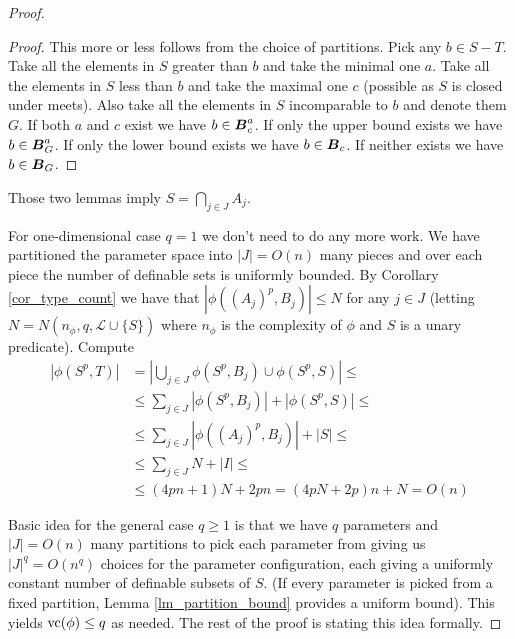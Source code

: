 \documentclass{amsart}
\DeclareMathOperator{\BT}{\boldface B}
\renewcommand{\LL}{\mathcal L}
\begin{document}
\begin{proof}
  \begin{proof}
    This more or less follows from the choice of partitions. Pick any $b \in S - T$. Take all the elements in $S$ greater than $b$ and take the minimal one $a$. Take all the elements in $S$ less than $b$ and take the maximal one $c$ (possible as $S$ is closed under meets). Also take all the elements in $S$ incomparable to $b$ and denote them $G$. If both $a$ and $c$ exist we have $b \in \BT^a_c$. If only the upper bound exists we have $b \in \BT^a_G$. If only the lower bound exists we have $b \in \BT_c$. If neither exists we have $b \in \BT_G$.
  \end{proof}
  
  \begin{Note}
    Those two lemmas imply $S = \bigcap_{j \in J} A_j$.
  \end{Note}
  
  \begin{Note}
    For one-dimensional case $q = 1$ we don't need to do any more work. We have partitioned the parameter space into $|J| = O(n)$ many pieces and over each piece the number of definable sets is uniformly bounded. By Corollary \ref{cor_type_count} we have that $|\phi((A_j)^p, B_j)| \leq N$ for any $j \in J$ (letting $N = N(n_\phi, q, \LL \cup \{S\})$ where $n_\phi$ is the complexity of $\phi$ and $S$ is a unary predicate). Compute
    \begin{align*}
      |\phi(S^p, T)|
      &= \left|\bigcup_{j \in J} \phi(S^p, B_j) \cup \phi(S^p, S)\right| \leq \\
      &\leq \sum_{j \in J} |\phi(S^p, B_j)| + |\phi(S^p, S)| \leq \\
      &\leq \sum_{j \in J} |\phi((A_j)^p, B_j)| + |S| \leq \\
      &\leq \sum_{j \in J}N + |I| \leq \\
      &\leq (4pn + 1)N + 2pn = (4pN + 2p)n + N = O(n)
    \end{align*}
  \end{Note}
  Basic idea for the general case $q \geq 1$ is that we have $q$ parameters and $|J| = O(n)$ many partitions to pick each parameter from giving us $|J|^q = O(n^q)$ choices for the parameter configuration, each giving a uniformly constant number of definable subsets of $S$. (If every parameter is picked from a fixed partition, Lemma \ref{lm_partition_bound} provides a uniform bound). This yields $\operatorname{vc}(\phi) \leq q$ as needed. The rest of the proof is stating this idea formally.
  

\end{proof}
\end{document}

